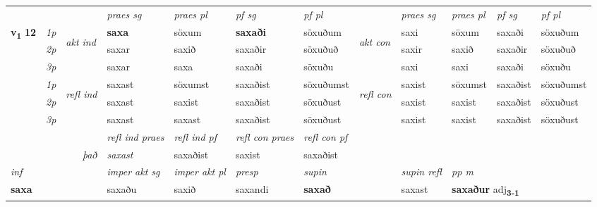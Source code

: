 \begin{longtable}[l]{X>{\footnotesize\itshape}llXXXXlXXXX}
\midrule

 & &   & \textit{praes sg}  & \textit{praes pl}    & \textit{ pf sg} & \textit{pf pl} & & \textit{praes sg}  & \textit{praes pl}    & \textit{pf sg} & \textit{pf pl }  \\ \cmidrule{4-7} \cmidrule{9-12}
 \multirow{2}{*}{{{\textbf{v{\textsubscript{1}}} \Large{\textbf{12}}}}}  & 1p & \multirow{3}{*}{\begin{turn}{90}\textit{akt ind}\end{turn}} & \textbf{saxa} & söxum & \textbf{saxaði} & söxuðum & \multirow{3}{*}{\begin{turn}{90}\textit{akt con}\end{turn}} &saxi & söxum & saxaði & söxuðum\\*
 & 2p &  &  saxar  & saxið & saxaðir & söxuðuð & & saxir & saxið & saxaðir & söxuðuð \\*
 & 3p &  & saxar & saxa & saxaði & söxuðu & & saxi & saxi& saxaði & söxuðu \\*
\cmidrule{4-7} \cmidrule{9-12}
 & 1p & \multirow{3}{*}{\begin{turn}{90}\textit{refl ind}\end{turn}}  & saxast & söxumst & saxaðist & söxuðumst & \multirow{3}{*}{\begin{turn}{90}\textit{refl con}\end{turn}}  &saxist & söxumst & saxaðist & söxuðumst \\*
 & 2p &  & saxast & saxist & saxaðist & söxuðust & &saxist & saxist & saxaðist & söxuðust \\*
 & 3p  & & saxast & saxast & saxaðist & söxuðust & & saxist & saxist& saxaðist & söxuðust \\*
\cmidrule{4-7} \cmidrule{9-12}

 & && \textit{refl ind praes} & \textit{refl ind pf} & \textit{refl con praes} & \textit{refl con pf} \\*
\multicolumn{3}{r}{\textit{það}}& saxast & saxaðist & saxist & saxaðist \\*

\cmidrule{4-7}
   {\textit{inf}} & &  & \textit{imper akt sg} & \textit{imper akt pl}   & \textit{presp} & \textit{supin} && \textit{supin refl} & \textit{pp m} \\*
  {\textbf{saxa}} & && saxaðu  & saxið   & saxandi &  \textbf{saxað} && saxast & \multicolumn{2}{l}{\textbf{saxaður} adj\textbf{\textsubscript{3-1}}} \\*

\midrule


\end{longtable}
